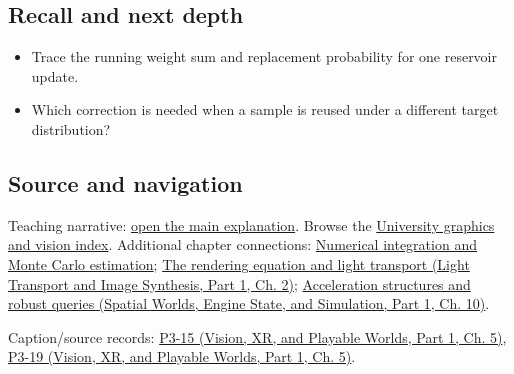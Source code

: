 \subsection{Recall and next depth}\label{appendix-68be451b78b1-recall-and-next-depth}

\hypertarget{appendix-68be451b78b1-recall-and-next-depth}{}

\begin{itemize}
\tightlist
\item
  Trace the running weight sum and replacement probability for one reservoir update.
\item
  Which correction is needed when a sample is reused under a different target distribution?
\end{itemize}

\subsection{Source and navigation}\label{appendix-68be451b78b1-source-and-navigation}

\hypertarget{appendix-68be451b78b1-source-and-navigation}{}

Teaching narrative: \hyperref[03-visual-computing-i-ch012-numerical-integration-and-monte-carlo-estimation]{open the main explanation}. Browse the \hyperref[appendix-a6d556a4ef50-university-graphics-vision-and-photography---independent-series]{University graphics and vision index}. Additional chapter connections: \hyperref[03-visual-computing-i-ch012-numerical-integration-and-monte-carlo-estimation]{Numerical integration and Monte Carlo estimation}; \href{../04-Light-Transport-and-Image-Synthesis-P01/main.pdf\#nameddest=03-visual-computing-i-ch007-the-rendering-equation-and-light-transport}{The rendering equation and light transport (Light Transport and Image Synthesis, Part 1, Ch. 2)}; \href{../05-Spatial-Worlds-Engine-State-and-Simulation-P01/main.pdf\#nameddest=04-visual-computing-ii-ch029-acceleration-structures-and-robust-queries-1}{Acceleration structures and robust queries (Spatial Worlds, Engine State, and Simulation, Part 1, Ch. 10)}.

Caption/source records: \href{../07-Vision-XR-and-Playable-Worlds-P01/main.pdf\#nameddest=04-visual-computing-ii-ch036-p3-15---ray-tracing}{P3-15 (Vision, XR, and Playable Worlds, Part 1, Ch. 5)}, \href{../07-Vision-XR-and-Playable-Worlds-P01/main.pdf\#nameddest=04-visual-computing-ii-ch036-p3-19---shadows-part-2}{P3-19 (Vision, XR, and Playable Worlds, Part 1, Ch. 5)}.
